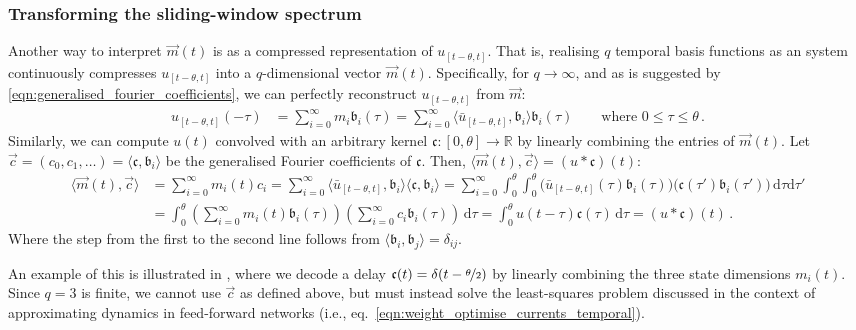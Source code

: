 \subsubsection{Transforming the sliding-window spectrum}
Another way to interpret $\vec m(t)$ is as a compressed representation of $u_{[t - \theta, t]}$.
That is, realising $q$ temporal basis functions as an \LTI system continuously compresses $u_{[t - \theta, t]}$ into a $q$-dimensional vector $\vec m(t)$.
Specifically, for $q \to \infty$, and as is suggested by \cref{eqn:generalised_fourier_coefficients}, we can perfectly reconstruct $u_{[t - \theta, t]}$ from $\vec m$:
\begin{align*}
	u_{[t - \theta, t]}(-\tau) &= \sum_{i = 0}^\infty m_i \mathfrak{b}_i(\tau) = \sum_{i = 0}^\infty \langle \bar u_{[t - \theta, t]}, \mathfrak{b}_i \rangle \mathfrak{b}_i(\tau) \quad\quad \text{where } 0 \leq \tau \leq \theta \,.
\end{align*}
Similarly, we can compute $u(t)$ convolved with an arbitrary kernel $\mathfrak{c} : [0, \theta] \longrightarrow \mathbb{R}$ by linearly combining the entries of $\vec m(t)$.
Let $\vec{c} = (c_0, c_1, \ldots) = \langle \mathfrak{c}, \mathfrak{b}_i \rangle$ be the generalised Fourier coefficients of $\mathfrak{c}$.
Then, $\langle \vec m(t), \vec{c} \rangle = (u \ast \mathfrak{c})(t)$:
\begin{align*}
	\langle \vec m(t), \vec{c} \rangle
		&= \sum_{i = 0}^\infty m_i(t) c_i
		 = \sum_{i = 0}^\infty \langle \bar u_{[t - \theta, t]}, \mathfrak{b}_i \rangle \langle \mathfrak{c}, \mathfrak{b}_i \rangle 
		 = \sum_{i = 0}^\infty \int_0^\theta \!\! \int_0^\theta \!\!
		 	\bigl( \bar u_{[t - \theta, t]}(\tau) \mathfrak{b}_i(\tau) \bigr)
		 	\bigl( \mathfrak{c}(\tau') \mathfrak{b}_i(\tau') \bigr) \,\mathrm{d}\tau \mathrm{d}\tau' \\
		&= \int_0^\theta \!\!
			\left(\sum\nolimits_{i = 0}^\infty m_i(t) \mathfrak{b}_i(\tau) \right)
			\left(\sum\nolimits_{i = 0}^\infty c_i \mathfrak{b}_i(\tau) \right) \,\mathrm{d}{\tau}
		 = \int_0^\theta \!\! u(t - \tau) \mathfrak{c}(\tau) \,\mathrm{d}{\tau}
		 = (u \ast \mathfrak{c})(t) \,.
\end{align*}
Where the step from the first to the second line follows from $\langle \mathfrak{b}_i, \mathfrak{b}_j \rangle = \delta_{ij}$.

An example of this is illustrated in , where we decode a delay $\mathfrak{c}(t) = \delta(t - \nicefrac{\theta}2)$ by linearly combining the three state dimensions $m_i(t)$.
Since $q = 3$ is finite, we cannot use $\vec c$ as defined above, but must instead solve the least-squares problem discussed in the context of approximating dynamics in feed-forward networks (i.e., eq.~\ref{eqn:weight_optimise_currents_temporal}).

